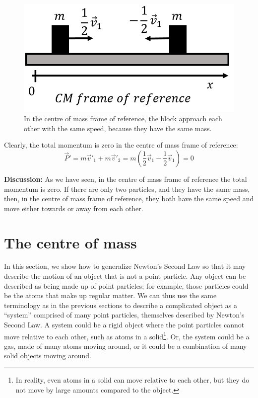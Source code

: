 \documentclass[9pt,arxiv,red]{lapreprint}
\begin{document}
\begin{framed}
\begin{framed}
\begin{figure}[!htbp]
\centering
\includegraphics[width=0.4\linewidth]{files/cmframe-e97482a4cf5f187af2d422a8562db512.png}
\caption[]{In the centre of mass frame of reference, the block approach each other with the same speed, because they have the same mass.}
\label{fig:momentumandcm:cmframe}
\end{figure}

Clearly, the total momentum is zero in the centre of mass frame of reference:
\begin{equation}
\vec P' = m\vec v'_1+ m\vec v'_2 = m \left(\frac{1}{2}\vec v_1 - \frac{1}{2}\vec v_1\right) = 0
\end{equation}

\textbf{Discussion:} As we have seen, in the centre of mass frame of reference the total momentum is zero. If there are only two particles, and they have the same mass, then, in the centre of mass frame of reference, they both have the same speed and move either towards or away from each other.
\end{framed}
\end{framed}

\section{The centre of mass}

In this section, we show how to generalize Newton's Second Law so that it may describe the motion of an object that is not a point particle. Any object can be described as being made up of point particles; for example, those particles could be the atoms that make up regular matter. We can thus use the same terminology as in the previous sections to describe a complicated object as a ``system'' comprised of many point particles, themselves described by Newton's Second Law. A system could be a rigid object where the point particles cannot move relative to each other, such as atoms in a solid\footnote{In reality, even atoms in a solid can move relative to each other, but they do not move by large amounts compared to the object.}. Or, the system could be a gas, made of many atoms moving around, or it could be a combination of many solid objects moving around.
\end{document}
